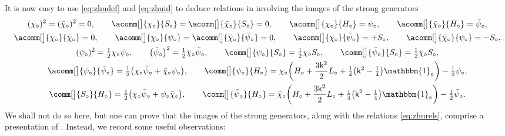 \documentclass[pdftex]{sigma}
\numberwithin{equation}{section}
\newcommand{\wun}{\mathbbm{1}} %
\newcommand{\bchi}{\bar{\chi}{}} %
\newcommand{\bpsi}{\bar{\psi}{}} %
\newcommand{\kk}{\mathsf{k}} %
\DeclarePairedDelimiter{\brac}{\lparen}{\rparen} %
\newcommand{\VOA}[1]{\mathsf{#1}} %
\newcommand{\uwalg}[2]{\VOA{W}^{#1}_{\mathrm{#2}}} %
\newcommand{\upr}[1][\kk]{\uwalg{#1}{pr}} %
\newcommand{\zh}[1]{#1_{\circ}} %
\begin{document}
It is now easy to use \eqref{eq:zhudef} and \eqref{eq:zhuid} to deduce relations in \smash{$\zhu{\upr}$} involving the images of the strong generators
\begin{gather}
			(\zh{\chi})^2 = (\zh{\bchi})^2 = 0,\qquad
			\acomm[\big]{\zh{\chi}}{\zh{S}} = \acomm[\big]{\zh{\bchi}}{\zh{S}} = 0,\qquad
			\acomm[\big]{\zh{\chi}}{\zh{H}} = \zh{\psi},\qquad
			\acomm[\big]{\zh{\bchi}}{\zh{H}} = \zh{\bpsi},\nonumber
			\\
			\acomm[\big]{\zh{\chi}}{\zh{\bchi}} = 0,\qquad
			\acomm[\big]{\zh{\chi}}{\zh{\psi}} = \acomm[\big]{\zh{\bchi}}{\zh{\bpsi}} = 0,\qquad
			\acomm[\big]{\zh{\chi}}{\zh{\bpsi}} = +\zh{S},\qquad
			\acomm[\big]{\zh{\bchi}}{\zh{\psi}} = -\zh{S},\nonumber
		\\
		(\zh{\psi})^2 = \tfrac{1}{2}\zh{\chi}\zh{\psi}, \qquad
		\big(\zh{\bpsi}\big)^2 = \tfrac{1}{2}\zh{\bchi}\zh{\bpsi}, \qquad
		\comm[\big]{\zh{\psi}}{\zh{S}} = \tfrac{1}{2}\zh{\chi}\zh{S}, \qquad
		\comm[\big]{\zh{\bpsi}}{\zh{S}} = \tfrac{1}{2}\zh{\bchi}\zh{S},\label{eq:zhurels}
		\\
			\acomm[\big]{\zh{\psi}}{\zh{\bpsi}} = \tfrac{1}{2}\brac[\big]{\zh{\chi}\zh{\bpsi} + \zh{\bchi}\zh{\psi}}, \qquad
			\comm[\big]{\zh{\psi}}{\zh{H}} = \zh{\chi}\brac[\bigg]{\zh{H}+\frac{3\kk^2}{2}\zh{L}+\tfrac{1}{4}\big(\kk^2-\tfrac{1}{4}\big)\zh{\wun}} - \tfrac{1}{2}\zh{\psi},\nonumber
			\\
			\comm[\big]{\zh{S}}{\zh{H}} = \tfrac{1}{2}\brac[\big]{\zh{\chi}\zh{\bpsi} + \zh{\psi}\zh{\bchi}}, \qquad
			\comm[\big]{\zh{\bpsi}}{\zh{H}} = \zh{\bchi}\brac[\bigg]{\zh{H}+\frac{3\kk^2}{2}\zh{L}+\tfrac{1}{4}\bigl(\kk^2-\tfrac{1}{4}\bigr)\zh{\wun}} - \tfrac{1}{2}\zh{\bpsi}.\nonumber
\end{gather}
We shall not do so here, but one can prove that the images of the strong generators, along with the relations \eqref{eq:zhurels}, comprise a presentation of \smash{$\zhu{\upr}$}.
Instead, we record some useful observations:
\end{document}

